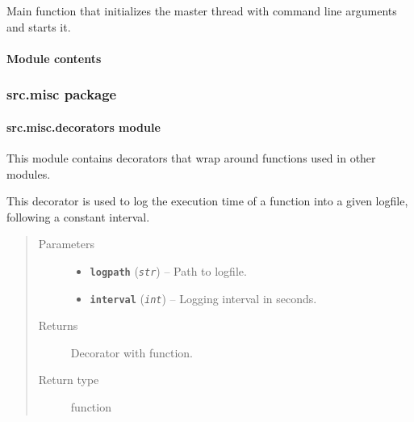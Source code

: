 \documentclass[letterpaper,10pt,english]{sphinxmanual}
\begin{document}

\begin{fulllineitems}
\label{src.mapping:src.mapping.mapthreading.main}
Main function that initializes the master thread with command line arguments and starts it.

\end{fulllineitems}



\paragraph{Module contents}
\label{src.mapping:module-src.mapping}\label{src.mapping:module-contents}

\subsubsection{src.misc package}
\label{src.misc:src-misc-package}\label{src.misc::doc}

\paragraph{src.misc.decorators module}
\label{src.misc:module-src.misc.decorators}\label{src.misc:src-misc-decorators-module}
This module contains decorators that wrap around functions used in other modules.

\begin{fulllineitems}
\label{src.misc:src.misc.decorators.log_time}
This decorator is used to log the execution time of a function into a given logfile, following a constant interval.
\begin{quote}\begin{description}
\item[{Parameters}] \leavevmode\begin{itemize}
\item {} 
\textbf{\texttt{logpath}} (\emph{\texttt{str}}) -- Path to logfile.

\item {} 
\textbf{\texttt{interval}} (\emph{\texttt{int}}) -- Logging interval in seconds.

\end{itemize}

\item[{Returns}] \leavevmode
Decorator with function.

\item[{Return type}] \leavevmode
function

\end{description}\end{quote}

\end{fulllineitems}
\end{document}
